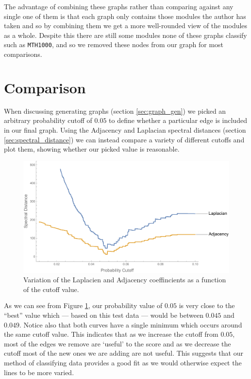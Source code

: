 \documentclass[english, 12pt]{article}
\begin{document}
The advantage of combining these graphs rather than comparing against any single one of them is that each graph only contains those modules the author has taken and so by combining them we get a more well-rounded view of the modules as a whole. Despite this there are still some modules none of these graphs classify such as \texttt{MTH1000}, and so we removed these nodes from our graph for most comparisons.

\section{Comparison}
When discussing generating graphs (section \ref{sec:graph_gen}) we picked an arbitrary probability cutoff of $0.05$ to define whether a particular edge is included in our final graph. Using the Adjacency and Laplacian spectral distances (section \ref{sec:spectral_distance}) we can instead compare a variety of different cutoffs and plot them, showing whether our picked value is reasonable.
\begin{figure}[H]
\centering
\includegraphics[scale=0.6]{CutoffComparison.pdf}
\caption{Variation of the Laplacien and Adjacency coeffincients as a function of the cutoff value.}
\label{fig:cutoff_comp}
\end{figure}

As we can see from Figure \ref{fig:cutoff_comp}, our probability value of $0.05$ is very close to the ``best'' value which --- based on this test data --- would be between $0.045$ and $0.049$. Notice also that both curves have a single minimum which occurs around the same cutoff value. This indicates that as we increase the cutoff from $0.05$, most of the edges we remove are `useful' to the score and as we decrease the cutoff most of the new ones we are adding are not useful. This suggests that our method of classifying data provides a good fit as we would otherwise expect the lines to be more varied.
\end{document}
